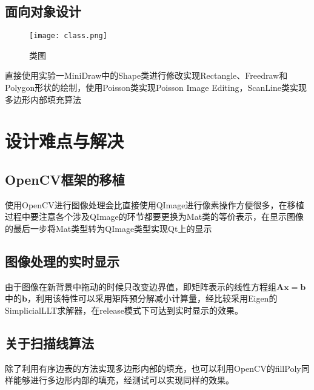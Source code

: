 \documentclass[14pt]{scrartcl} %
\begin{document}
\pagebreak
\subsection{面向对象设计}

\begin{figure}[h] %
	\centering
	\texttt{[image: class.png]} %
	\caption{类图}
\end{figure}

直接使用实验一MiniDraw中的Shape类进行修改实现Rectangle、Freedraw和Polygon形状的绘制，使用Poisson类实现Poisson Image Editing，ScanLine类实现多边形内部填充算法

\pagebreak
\section{设计难点与解决}

\subsection{OpenCV框架的移植}

使用OpenCV进行图像处理会比直接使用QImage进行像素操作方便很多，在移植过程中要注意各个涉及QImage的环节都要更换为Mat类的等价表示，在显示图像的最后一步将Mat类型转为QImage类型实现Qt上的显示

\subsection{图像处理的实时显示}

由于图像在新背景中拖动的时候只改变边界值，即矩阵表示的线性方程组$\boldsymbol A \boldsymbol x=\boldsymbol b$中的$\boldsymbol b$，利用该特性可以采用矩阵预分解减小计算量，经比较采用Eigen的SimplicialLLT求解器，在release模式下可达到实时显示的效果。 

\subsection{关于扫描线算法}

除了利用有序边表的方法实现多边形内部的填充，也可以利用OpenCV的fillPoly同样能够进行多边形内部的填充，经测试可以实现同样的效果。



\pagebreak
\end{document}
